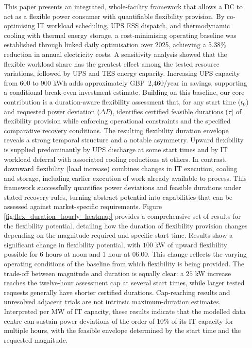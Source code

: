\documentclass[lettersize,journal]{IEEEtran}
\newcommand{\rev}[1]{#1}
\begin{document}
This paper presents an integrated, whole-facility framework that allows a DC to act as a flexible power consumer with quantifiable flexibility provision. By co-optimising IT workload scheduling, UPS ESS dispatch, and thermodynamic cooling with thermal energy storage, a cost-minimising operating baseline was established through linked daily optimisation over 2025, achieving a \rev{5.38\% reduction in annual electricity costs. A sensitivity analysis showed that the flexible workload share has the greatest effect among the tested resource variations, followed by UPS and TES energy capacity. Increasing UPS capacity from 600 to 900 kWh adds approximately GBP~2,460/year in savings, supporting a conditional break-even investment estimate.} Building on this baseline, our core contribution is a duration-aware flexibility assessment that, for any start time ($t_0$) and requested power deviation ($\Delta P$), identifies certified feasible durations ($\tau$) of flexibility provision while enforcing operational constraints and the specified comparative recovery conditions. The resulting flexibility duration envelope reveals a strong temporal structure and a notable asymmetry. Upward flexibility is supplied predominantly by UPS discharge at some start times and by IT workload deferral with associated cooling reductions at others. In contrast, downward flexibility (load increase) combines changes in IT execution, cooling and storage, including earlier execution of work already available to process. This framework successfully quantifies power deviations and feasible durations under stated recovery rules, turning abstract potential into capabilities that can be assessed against market-specific requirements. Figure \ref{fig:flex_duration_hourly_heatmap} provides a comprehensive set of results for the flexibility potential, detailing how the duration of flexibility provision changes depending on the magnitude required and specific start time. Results show a significant change in flexibility potential, with $100$ kW of upward flexibility possible for $6$ hours at noon and $1$ hour at $06$:$00$. This change reflects the varying operating conditions of the baseline from which flexibility is being provided. \rev{The trade-off between magnitude and duration is equally clear: a $25$ kW increase reaches the twelve-hour assessment cap at several start times, while larger tested requests generally have shorter certified durations. Cap-reaching results and unresolved adjacent trials are not intrinsic maximum-duration estimates. Interpreted per MW of IT capacity, these results indicate that the modelled data centre can sustain power deviations of the order of $10\%$ of its IT capacity for multiple hours, with the feasible envelope determined by the start time and the requested magnitude.}
\end{document}
